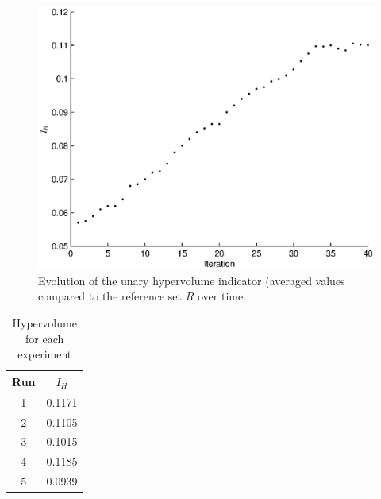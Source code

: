 \begin{figure}[h!]
\begin{center}
\includegraphics[width=1\linewidth]{hypervolref2.eps}
\end{center}
\vspace{-0.5cm}
\caption{Evolution of the unary hypervolume indicator (averaged values compared to the reference set $R$ over time}
\label{fig:hypervolref}
\end{figure}

\begin{table}[h!]
\begin{center}
\begin{tabular}{|c|c|}
\hline Run & $I_H$\\
\hline 1 & 0.1171\\
\hline 2 & 0.1105\\
\hline 3 & 0.1015\\
\hline 4 & 0.1185\\
\hline 5 & 0.0939\\
\hline 
\end{tabular}
\end{center}
\caption{Hypervolume for each experiment}
\label{tab:hypervol}
\end{table}

